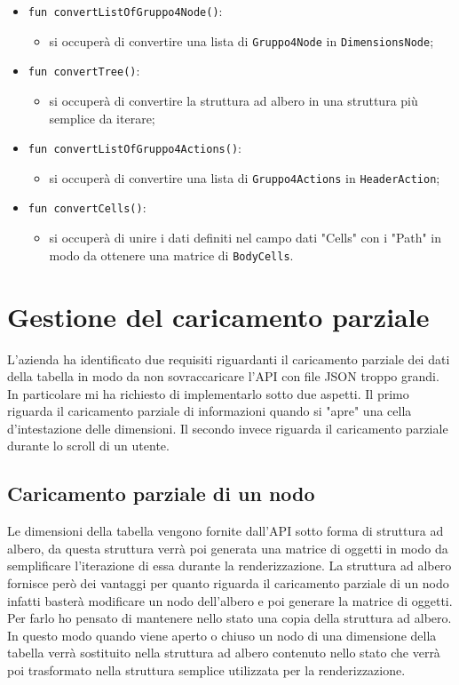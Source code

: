 \begin{itemize}
	\item \verb|fun convertListOfGruppo4Node()|:
	\begin{itemize}
		\item si occuperà di convertire una lista di \verb|Gruppo4Node| in \verb|DimensionsNode|;
	\end{itemize}

	\item \verb|fun convertTree()|:
	\begin{itemize}
		\item si occuperà di convertire la struttura ad albero in una struttura più semplice da iterare;
	\end{itemize}
	
	\item \verb|fun convertListOfGruppo4Actions()|:
	\begin{itemize}
		\item si occuperà di convertire una lista di \verb|Gruppo4Actions| in \verb|HeaderAction|;
	\end{itemize}

	\item \verb|fun convertCells()|:
	\begin{itemize}
		\item si occuperà di unire i dati definiti nel campo dati "Cells" con i "Path" in modo da ottenere una matrice di \verb|BodyCells|.
	\end{itemize}
\end{itemize}

\section{Gestione del caricamento parziale}
L'azienda ha identificato due requisiti riguardanti il caricamento parziale dei dati della tabella in modo da non sovraccaricare l'API con file JSON troppo grandi. In particolare mi ha richiesto di implementarlo sotto due aspetti. Il primo riguarda il caricamento parziale di informazioni quando si "apre" una cella d'intestazione delle dimensioni. Il secondo invece riguarda il caricamento parziale durante lo scroll di un utente.

\subsection*{Caricamento parziale di un nodo}
Le dimensioni della tabella vengono fornite dall'API sotto forma di struttura ad albero, da questa struttura verrà poi generata una matrice di oggetti in modo da semplificare l'iterazione di essa durante la renderizzazione. La struttura ad albero fornisce però dei vantaggi per quanto riguarda il caricamento parziale di un nodo infatti basterà modificare un nodo dell'albero e poi generare la matrice di oggetti. Per farlo ho pensato di mantenere nello stato una copia della struttura ad albero. In questo modo quando viene aperto o chiuso un nodo di una dimensione della tabella verrà sostituito nella struttura ad albero contenuto nello stato che verrà poi trasformato nella struttura semplice utilizzata per la renderizzazione.


